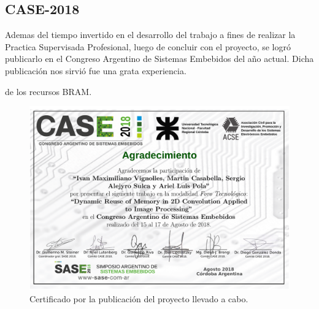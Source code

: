 \documentclass[]{IEEEphot}
\begin{document}
\subsection{CASE-2018}
Ademas del tiempo invertido en el desarrollo del trabajo a fines de realizar la Practica Supervisada Profesional, luego de concluir con el proyecto, se logró publicarlo en
el Congreso Argentino de Sistemas Embebidos del año actual. Dicha publicación nos sirvió fue una grata experiencia.



de los recursos BRAM. 
\begin{figure}[H]
\centering
\includegraphics[scale=0.5]{certificado_CASE}
\caption{Certificado por la publicación del proyecto llevado a cabo.}
\label{CASE}
\end{figure}

\end{document}
